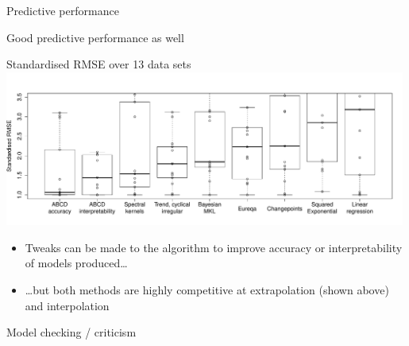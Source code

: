 \begin{frame}{Predictive performance}
  
\end{frame}

\begin{frame}{Good predictive performance as well}
  \begin{block}{Standardised RMSE over 13 data sets}
  \includegraphics[width=0.99\textwidth]{../figures/box_extrap_wide}\\
  \begin{itemize}
    \item Tweaks can be made to the algorithm to improve accuracy or interpretability of models produced\ldots
    \vspace{\baselineskip}
    \item \ldots but both methods are highly competitive at extrapolation (shown above) and interpolation
  \end{itemize}
  \end{block}
\end{frame}

\begin{frame}{Model checking / criticism}
  
\end{frame}

